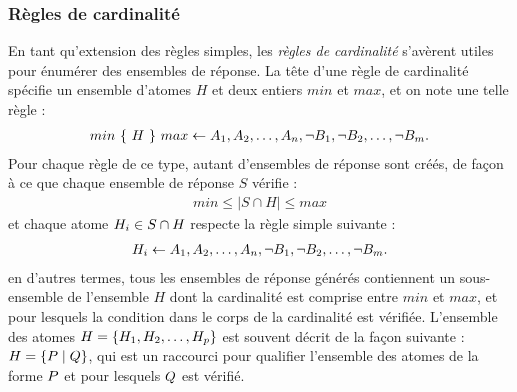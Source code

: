 \subsubsection{Règles de cardinalité}

En tant qu'extension des règles simples, les \emph{règles de cardinalité} s'avèrent
utiles pour énumérer des ensembles de réponse.
La tête d'une règle de cardinalité spécifie un ensemble d'atomes $H$ et deux entiers
$min$ et $max$, et on note une telle règle :
\begin{align*}
  min\ \{\ H\ \}\ max \leftarrow A_1, A_2, \dots, A_n, \neg B_1,
  \neg B_2, \dots, \neg B_m.
\end{align*}
Pour chaque règle de ce type, autant d'ensembles de réponse sont créés, de façon à ce que
chaque ensemble de réponse $S$ vérifie :
\begin{align*}
  min \leq |S \cap H| \leq max
\end{align*}
et chaque atome $H_i \in S \cap H$ respecte la règle simple suivante :
\begin{align*}
  H_i \leftarrow A_1, A_2, \dots, A_n, \neg B_1,
  \neg B_2, \dots, \neg B_m.
\end{align*}
en d'autres termes, tous les ensembles de réponse générés contiennent un sous-ensemble de
l'ensemble $H$ dont la cardinalité est comprise entre $min$ et $max$,
et pour lesquels la condition dans le corps de la cardinalité est vérifiée.
L'ensemble des atomes $H = \{ H_1, H_2, \dots, H_p \}$
est souvent décrit de la façon suivante : $H = \{ P \mid Q \}$,
qui est un raccourci pour qualifier l'ensemble des atomes de la forme
$P$ et pour lesquels $Q$ est vérifié.

